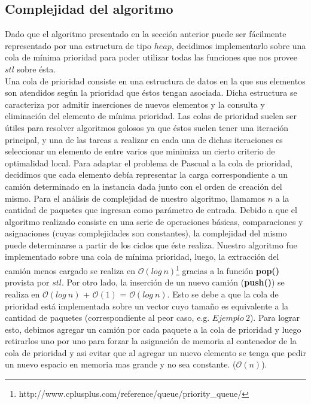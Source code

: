 \subsection{Complejidad del algoritmo}

Dado que el algoritmo presentado en la sección anterior puede ser fácilmente representado por una estructura de tipo $heap$, decidimos implementarlo sobre una cola de mínima prioridad para poder utilizar todas las funciones que nos provee $stl$ sobre ésta.\\
Una cola de prioridad consiste en una estructura de datos en la que sus elementos son atendidos según la prioridad que éstos tengan asociada. Dicha estructura se caracteriza por admitir inserciones de nuevos elementos y la consulta y eliminación del elemento de mínima prioridad.\newline
Las colas de prioridad suelen ser útiles para resolver algoritmos golosos ya que éstos suelen tener una iteración principal, y una de las tareas a realizar en cada una de dichas iteraciones es seleccionar un elemento de entre varios que minimiza un cierto criterio de optimalidad local.\newline
Para adaptar el problema de Pascual a la cola de prioridad, decidimos que cada elemento debía representar la carga correspondiente a un camión determinado en la instancia dada junto con el orden de creación del mismo.\newline
\newline
Para el análisis de complejidad de nuestro algoritmo, llamamos $n$ a la cantidad de paquetes que ingresan como parámetro de entrada.\newline
\newline
Debido a que el algoritmo realizado consiste en una serie de operaciones básicas, comparaciones y asignaciones (cuyas complejidades son constantes), la complejidad del mismo puede determinarse a partir de los ciclos que éste realiza.\newline
\newline
Nuestro algoritmo fue implementado sobre una cola de mínima prioridad, luego, la extracción del camión menos cargado se realiza en $\mathcal{O}(log\ n)$\footnote{http://www.cplusplus.com/reference/queue/priority\_queue/} gracias a la función \textbf{pop()} provista por $stl$.\newline
\newline
Por otro lado, la inserción de un nuevo camión (\textbf{push()}) se realiza en $\mathcal{O}(log\ n)$ + $\mathcal{O}(1)$ = $\mathcal{O}(log\ n)$\footnotemark[1]. Esto se debe a que la cola de prioridad está implementada sobre un vector cuyo tamaño es equivalente a la cantidad de paquetes (correspondiente al peor caso, e.g. $Ejemplo\ 2$). Para lograr esto, debimos agregar un camión por cada paquete a la cola de prioridad y luego retirarlos uno por uno para forzar la asignación de memoria al contenedor de la cola de prioridad y asi evitar que al agregar un nuevo elemento se tenga que pedir un nuevo espacio en memoria mas grande y no sea constante. ($\mathcal{O}(n)$).\newline
